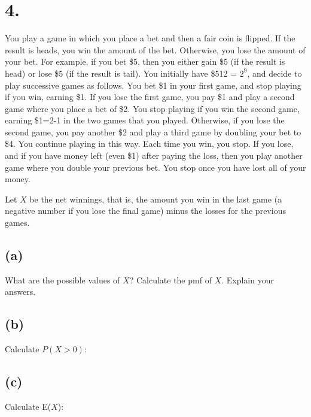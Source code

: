 \documentclass{article}
\begin{document}
\section*{4.}
{\Large 
You play a game in which you place a bet and then a fair coin is flipped. If the result is heads, you win the
amount of the bet. Otherwise, you lose the amount of your bet.
For example, if you bet \$5, then you either gain \$5 (if the result is head) or lose \$5 (if the result is tail).
You initially have \$512 = $2^9$, and decide to play successive games as follows. You bet \$1 in your first game, and stop playing if you win, earning \$1. If you lose the first game, you pay \$1 and play a second game where you place a bet of \$2. You stop playing if you win the second game, earning \$1=2-1 in the two games that you played. Otherwise, if you lose the second game, you pay another \$2 and play a third game by doubling your bet to \$4. You continue playing in this way. Each time you win, you stop. If you lose, and if you have money left (even \$1) after paying the loss, then you play another game where you double your previous bet.
You stop once you have lost all of your money. 

Let $X$ be the net winnings, that is, the amount you win in the last game 
(a negative number if you lose the final game) minus the losses for the previous games.

\subsection*{(a)}
What are the possible values of $X$? Calculate the pmf of $X$. Explain your answers.


\subsection*{(b)}
Calculate $P(X > 0)$:


\subsection*{(c)}
Calculate E($X$):


}
\end{document}
